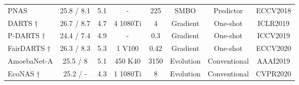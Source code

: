 \documentclass[sigconf]{acmart}
\begin{document}
\begin{table*}[!th]
\begin{tabular}{l|c|c|c|c|c|c|c}
PNAS \cite{Ref:40}                                       & 25.8 / 8.1                                                                                  & 5.1                                                           & -                                & 225                                                                       & SMBO                                       & Predictor   &ECCV2018                                    \\
DARTS \cite{Ref:10}$\dagger$                         & 26.7 / 8.7                                                                                & 4.7                                                           & 4 1080Ti                         & 4                                                                       & Gradient                                   & One-shot  &ICLR2019                                     \\
P-DARTS \cite{Ref:52}$\dagger$                     & 24.4 / 7.4                                                                                         & 4.9                                                           & -                                & 0.3                                                                       & Gradient                                  & One-shot &ICCV2019                                        \\
FairDARTS \cite{Ref:35}$\dagger$                  & 26.3 / 8.3                                                                                        & 5.3                                                           & 1 V100                                & 0.42                                                                       & Gradient                                  & One-shot           &ECCV2020                            \\
AmoebaNet-A \cite{Ref:08}                        & 25.5 / 8                                                                                  & 5.1                                                           & 450 K40                          & 3150                                                                      & Evolution                                  & Conventional  &AAAI2019                                  \\
EcoNAS \cite{Ref:58}$\dagger$                  & 25.2 / -                                                                                      & 4.3                                                           & 1 1080Ti                                & 8                                                                       & Evolution                                  & Conventional  &CVPR2020                                        \\


\end{tabular}
\end{table*}
\end{document}
